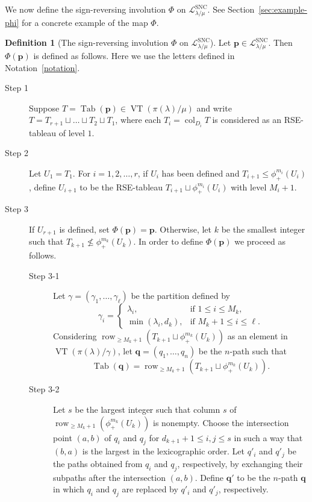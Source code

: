 \documentclass{amsart}
\numberwithin{equation}{section}
\theoremstyle{definition}
\newtheorem{defn}[thm]{Definition}
\newcommand\VT{\operatorname{VT}}
\newcommand\Tab{\operatorname{Tab}}
\newcommand\LL{\mathcal{L}_\lm}
\newcommand\lsnc{\LL^{\operatorname{SNC}}}
\newcommand\col{\operatorname{col}}
\newcommand\row{\operatorname{row}}
\newcommand\pd{\phi_+}
\newcommand\pp{\mathbf{p}}
\newcommand\lm{{\lambda/\mu}}
\begin{document}
We now define the sign-reversing involution $\Phi$ on $\lsnc$. See
Section~\ref{sec:example-phi} for a concrete example of the map $\Phi$.

\begin{defn}[The sign-reversing involution $\Phi$ on $\lsnc$]
  \label{def:Phi}
  Let $\pp\in\lsnc$. Then $\Phi(\pp)$ is defined as follows. Here we use the
  letters defined in Notation~\ref{notation}.
  \begin{description}
  \item[Step 1] Suppose $T=\Tab(\pp)\in \VT(\pi(\lambda)/\mu)$ and write
    $T=T_{r+1}\sqcup \dots\sqcup T_2\sqcup T_1$, where each $T_i=\col_{D_i}T$ is
    considered as an RSE-tableau of level $1$.
  \item[Step 2] Let $U_1=T_1$. For $i=1,2,\dots,r$, if $U_{i}$ has been
    defined and $T_{i+1}\le \pd^{m_i}(U_{i})$, define $U_{i+1}$ to be the
    RSE-tableau $T_{i+1}\sqcup \pd^{m_i}(U_{i})$ with level $M_i+1$.
  \item[Step 3] If $U_{r+1}$ is defined, set $\Phi(\pp)=\pp$. Otherwise, let $k$ be
    the smallest integer such that $T_{k+1}\not\le \pd^{m_k}(U_{k})$. In order
    to define $\Phi(\pp)$ we proceed as follows.
    \begin{description}
    \item[Step 3-1] Let $\gamma=(\gamma_1,\dots,\gamma_\ell)$ be the partition
      defined by
      \[
\gamma_i = 
        \begin{cases}
          \lambda_i, & \mbox{if $1\le i \le M_k$,}\\
          \min(\lambda_i,d_k), & \mbox{if $M_k+1\le i\le \ell$}.
        \end{cases}
      \]      
     Considering $\row_{\ge
        M_k+1}(T_{k+1}\sqcup \pd^{m_k}(U_{k}))$ as an element in
      $\VT(\pi(\lambda)/\gamma)$, let $\mathbf{q}=(q_1,\dots,q_n)$ be the $n$-path such
      that
\[
  \Tab(\mathbf{q})=\row_{\ge M_k+1}(T_{k+1}\sqcup \pd^{m_k}(U_{k})).
\]
\item[Step 3-2] Let $s$ be the largest integer such that column $s$ of
  $\row_{\ge M_k+1}(\pd^{m_k}(U_{k}))$ is nonempty. Choose the intersection
  point $(a,b)$ of $q_i$ and $q_j$ for $d_{k+1}+1\le i, j\le s$ in such a way
  that $(b,a)$ is the largest in the lexicographic order. Let $q'_i$ and $q'_j$
  be the paths obtained from $q_i$ and $q_j$, respectively, by exchanging their
  subpaths after the intersection $(a,b)$. Define $\mathbf{q'}$ to be the
  $n$-path $\mathbf{q}$ in which $q_i$ and $q_j$ are replaced by $q'_i$ and
  $q'_j$, respectively.

\end{description}
\end{description}
\end{defn}
\end{document}
